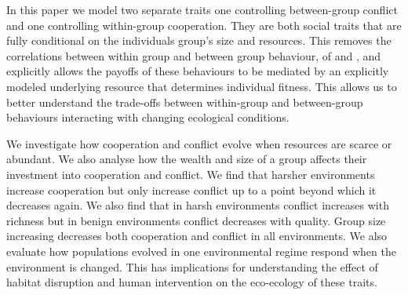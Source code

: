In this paper we model two separate traits one controlling between-group conflict and one controlling within-group cooperation. They are both social traits that are fully conditional on the individuals group's size and resources. This removes the correlations between within group and between group behaviour, of \citet{choiCoevolutionParochial2007} and \citet{lehmannWarEvolution2008}, and explicitly allows the payoffs of these behaviours to be mediated by an explicitly modeled underlying resource that determines individual fitness. This allows us to better understand the trade-offs between within-group and between-group behaviours interacting with changing ecological conditions.

We investigate how cooperation and conflict evolve when resources are scarce or abundant. We also analyse how the wealth and size of a group affects their investment into cooperation and conflict. We find that harsher environments increase cooperation but only increase conflict up to a point beyond which it decreases again. We also find that in harsh environments conflict increases with richness but in benign environments conflict decreases with quality. Group size increasing decreases both cooperation and conflict in all environments.
We also evaluate how populations evolved in one environmental regime respond when the environment is changed. This has implications for understanding the effect of habitat disruption and human intervention on the eco-ecology of these traits. 